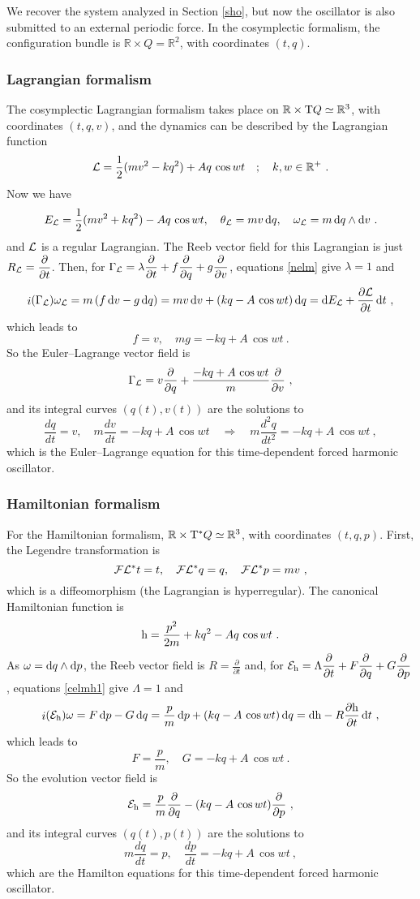 \documentclass[12pt]{report}
\def\dst{\displaystyle}
\def\derpar#1#2{\frac{\partial{#1}}{\partial{#2}}}
\def\Lag{{\cal L}}
\def\d{{\rm d}}
\def\Real{\mathbb{R}}
\def\Tan{{\rm T}}
\def\inn{\mathop{i}\nolimits}
\def\Leg{{\cal F}\Lag}
\begin{document}
We recover the system analyzed in Section \ref{sho},
but now the oscillator is also submitted to an external periodic force.
In the cosymplectic formalism,
the configuration bundle is $\Real\times Q=\Real^2$, with coordinates $(t,q)$.

\subsubsection{Lagrangian formalism}

The cosymplectic Lagrangian formalism takes place on $\Real\times \Tan Q\simeq\Real^3$, with coordinates 
$(t,q,v)$, and the dynamics can be described by the Lagrangian function
$$
\Lag=\frac{1}{2}(mv^2-kq^2)+Aq\,\cos w t \quad ; \quad k,w\in\Real^+ \ .
$$
Now we have
$$
E_\Lag=\frac{1}{2}(mv^2+kq^2)-Aq\,\cos w t ,\quad
\theta_\Lag=mv\,\d q ,\quad
\omega_\Lag=m\,\d q\wedge\d v \ .
$$
and $\Lag$ is a regular Lagrangian.
The Reeb vector field for this Lagrangian is just $\dst R_\Lag=\derpar{}{t}$.
Then, for $\displaystyle \Gamma_\Lag=\lambda\derpar{}{t}+f\derpar{}{q}+g\derpar{}{v}$, 
equations \eqref{nelm} give $\lambda=1$ and
$$
\inn(\Gamma_\Lag)\omega_\Lag=
m\,(f\, \d v-g\, \d q)=
mv\, \d v+(kq-A\,\cos w t)\, \d q=\d E_\Lag+\derpar{\Lag}{t}\,\d t\ ,
$$
which leads to
$$
f=v ,\quad mg=-kq+A\,\cos w t \ .
$$
So the Euler--Lagrange vector field is
$$
\Gamma_\Lag=v\derpar{}{q}+\frac{-kq+A\,\cos w t}{m}\derpar{}{v} \ ,
$$
and its integral curves $(q(t),v(t))$ are the solutions to
$$
\frac{dq}{dt} =v ,\quad m\frac{dv}{dt}=-kq+A\,\cos w t
\quad \Longrightarrow \quad m\frac{d^2q}{dt^2}=-kq+A\,\cos w t  \ ,
$$
which is the Euler--Lagrange equation for this time-dependent forced harmonic oscillator.


\subsubsection{Hamiltonian formalism}


For the Hamiltonian formalism, $\Real\times\Tan^*Q\simeq\Real^3$,
with coordinates $(t,q,p)$. First, the Legendre transformation is
$$
\Leg^*t=t  ,\quad \Leg^*q=q  ,\quad \Leg^*p=mv  \ ,
$$
which is a diffeomorphism (the Lagrangian is hyperregular).
The canonical Hamiltonian function is
$$
{\rm h}=\frac{p^2}{2m}+kq^2-Aq\,\cos w t  \ .
$$
As $\omega=\d q\wedge\d p$, the Reeb vector field is $\dst R=\derpar{}{t}$ and,
for $\displaystyle {\cal E}_{\rm h}=\Lambda\derpar{}{t}+F\derpar{}{q}+G\derpar{}{p}$,
equations \eqref{celmh1} give $\Lambda=1$ and
$$
\inn({\cal E}_{\rm h})\omega= F\, \d p-G\, \d q=
\frac{p}{m}\, \d p+(kq-A\,\cos w t )\, \d q=\d{\rm h}-R\derpar{{\rm h}}{t}\,\d t\ ,
$$
which leads to
$$
F=\frac{p}{m} ,\quad G=-kq+A\,\cos w t  \ .
$$
So the evolution vector field is
$$
{\cal E}_{\rm h}=\frac{p}{m}\derpar{}{q}-(kq-A\,\cos w t)\derpar{}{p}\ ,
$$
and its integral curves $(q(t),p(t))$ are the solutions to
$$
m\frac{dq}{dt} =p ,\quad
\frac{dp}{dt}=-kq+A\,\cos w t \ ,
$$
which are the Hamilton equations for this time-dependent forced harmonic oscillator.
\end{document}
